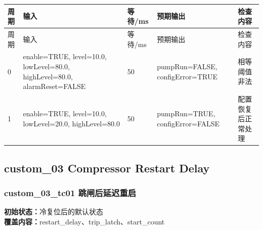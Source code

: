 \begin{longtable}{L{1.0cm}L{4.7cm}L{1.4cm}L{4.0cm}L{2.1cm}}

\toprule

周期 & 输入 & 等待/ms & 预期输出 & 检查内容\\

\midrule

\endfirsthead

\toprule

周期 & 输入 & 等待/ms & 预期输出 & 检查内容\\

\midrule

\endhead

0 & enable=TRUE, level=10.0, lowLevel=80.0, highLevel=80.0, alarmReset=FALSE & 50 & pumpRun=FALSE, configError=TRUE & 相等阈值非法\\

1 & enable=TRUE, level=10.0, lowLevel=20.0, highLevel=80.0 & 50 & pumpRun=TRUE, configError=FALSE & 配置恢复后正常处理\\

\bottomrule

\end{longtable}

\subsection{{\ttfamily custom\_03} Compressor Restart Delay}

\subsubsection{{\ttfamily custom\_03\_tc01} 跳闸后延迟重启}

\noindent\textbf{初始状态：}冷复位后的默认状态\\

\textbf{覆盖内容：}restart\_delay、trip\_latch、start\_count

